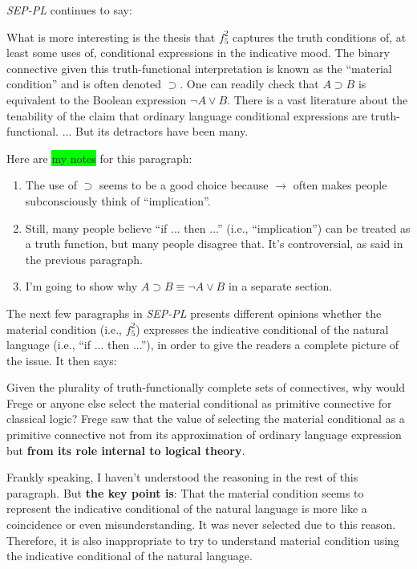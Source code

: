\documentclass[12pt, letterpaper]{article}
\begin{document}
\textit{SEP-PL} continues to say:

\begin{displayquote}
  What is more interesting is the thesis that $f_5^2$ captures the truth
  conditions of, at least some uses of, conditional expressions in the
  indicative mood. The binary connective given this truth-functional
  interpretation is known as the ``material condition'' and is often denoted
  $\supset$. One can readily check that $A \supset B$ is equivalent to the
  Boolean expression $\lnot A \lor B$. There is a vast literature about the
  tenability of the claim that ordinary language conditional expressions are
  truth-functional. ... But its detractors have been many.
\end{displayquote}

Here are \colorbox{lime}{my notes} for this paragraph:
\begin{enumerate}
  \item The use of $\supset$ seems to be a good choice because $\rightarrow$
        often makes people subconsciously think of ``implication''.
  \item Still, many people believe ``if ... then ...'' (i.e., ``implication'')
        can be treated as a truth function, but many people disagree that. It's
        controversial, as said in the previous paragraph.
  \item I'm going to show why $A \supset B \equiv \lnot A \lor B$ in a separate
        section.
\end{enumerate}

The next few paragraphs in \textit{SEP-PL} presents different opinions whether
the material condition (i.e., $f_5^2$) expresses the indicative conditional of
the natural language (i.e., ``if ... then ...''), in order to give the readers
a complete picture of the issue. It then says:

\begin{displayquote}
  Given the plurality of truth-functionally complete sets of connectives, why
  would Frege or anyone else select the material conditional as primitive
  connective for classical logic? Frege saw that the value of selecting the
  material conditional as a primitive connective not from its approximation of
  ordinary language expression but \textbf{from its role internal to logical
    theory}.
\end{displayquote}

Frankly speaking, I haven't understood the reasoning in the rest of this
paragraph. But \textbf{the key point is}: That the material condition seems to
represent the indicative conditional of the natural language is more like a
coincidence or even misunderstanding. It was never selected due to this reason.
Therefore, it is also inappropriate to try to understand material condition
using the indicative conditional of the natural language.
\end{document}
